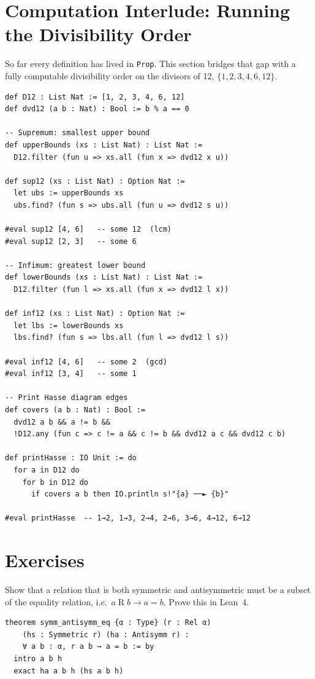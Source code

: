 \documentclass[12pt, a4paper, openright]{book}
\theoremstyle{thmstyle}
\theoremstyle{defstyle}
\newcommand{\lc}[1]{\texttt{#1}}
\newcounter{exercise}[chapter]
\newenvironment{exercisebox}[1][]{%
  \refstepcounter{exercise}%
  \begin{tcolorbox}[exercisebox,
    title={Exercise \thechapter.\theexercise\ifx\\#1\\\else\ --- #1\fi}]%
}{\end{tcolorbox}}
\begin{document}
\FloatBarrier
\section{Computation Interlude: Running the Divisibility Order}

So far every definition has lived in \lc{Prop}. This section bridges that gap
with a fully computable divisibility order on the divisors of 12,
$\{1,2,3,4,6,12\}$.

\begin{verbatim}
def D12 : List Nat := [1, 2, 3, 4, 6, 12]
def dvd12 (a b : Nat) : Bool := b % a == 0

-- Supremum: smallest upper bound
def upperBounds (xs : List Nat) : List Nat :=
  D12.filter (fun u => xs.all (fun x => dvd12 x u))

def sup12 (xs : List Nat) : Option Nat :=
  let ubs := upperBounds xs
  ubs.find? (fun s => ubs.all (fun u => dvd12 s u))

#eval sup12 [4, 6]   -- some 12  (lcm)
#eval sup12 [2, 3]   -- some 6

-- Infimum: greatest lower bound
def lowerBounds (xs : List Nat) : List Nat :=
  D12.filter (fun l => xs.all (fun x => dvd12 l x))

def inf12 (xs : List Nat) : Option Nat :=
  let lbs := lowerBounds xs
  lbs.find? (fun s => lbs.all (fun l => dvd12 l s))

#eval inf12 [4, 6]   -- some 2  (gcd)
#eval inf12 [3, 4]   -- some 1

-- Print Hasse diagram edges
def covers (a b : Nat) : Bool :=
  dvd12 a b && a != b &&
  !D12.any (fun c => c != a && c != b && dvd12 a c && dvd12 c b)

def printHasse : IO Unit := do
  for a in D12 do
    for b in D12 do
      if covers a b then IO.println s!"{a} ──► {b}"

#eval printHasse  -- 1→2, 1→3, 2→4, 2→6, 3→6, 4→12, 6→12
\end{verbatim}

\section{Exercises}

\begin{exercisebox}[Symmetry and antisymmetry]
  Show that a relation that is both symmetric and antisymmetric must be a
  subset of the equality relation, i.e.\ $a \mathrel{R} b \to a = b$.
  Prove this in Lean~4.
  \begin{verbatim}
theorem symm_antisymm_eq {α : Type} (r : Rel α)
    (hs : Symmetric r) (ha : Antisymm r) :
    ∀ a b : α, r a b → a = b := by
  intro a b h
  exact ha a b h (hs a b h)
  \end{verbatim}
\end{exercisebox}
\end{document}
